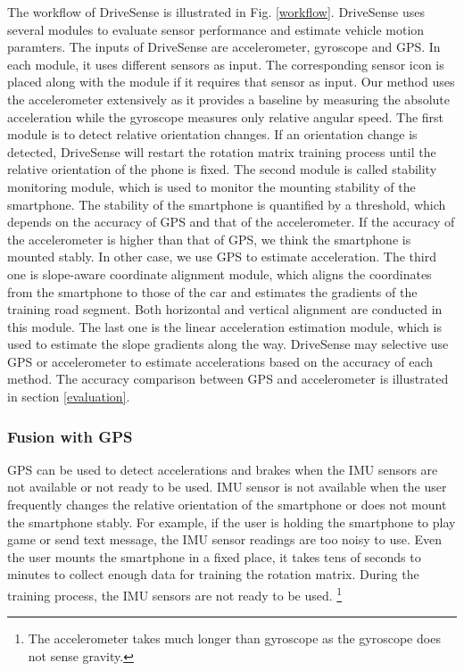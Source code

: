 The workflow of DriveSense is illustrated in Fig. \ref{workflow}. 
DriveSense uses several modules to evaluate sensor
performance and estimate vehicle motion paramters. 
The inputs of DriveSense are accelerometer, gyroscope
and GPS.  
In each module, it uses different sensors as input.  
The corresponding sensor icon is placed along with the 
module if it requires that sensor as input.  
Our method uses the accelerometer extensively
as it provides a baseline by measuring the absolute acceleration while
the gyroscope measures only relative angular speed. 
The first module is to detect relative orientation changes.  
If an orientation change is detected, 
DriveSense will restart the rotation matrix
training process until the 
relative orientation of the phone is fixed.  
The second module is called stability monitoring
module, which is used to monitor the mounting
stability of the smartphone. 
The stability of the smartphone is quantified
by a threshold, which depends on the 
accuracy of GPS and that of the accelerometer. 
If the accuracy of the accelerometer is higher
than that of GPS, we think the smartphone
is mounted stably. 
In other case, we use GPS to estimate acceleration.
The third one is slope-aware coordinate
alignment module, 
which aligns the coordinates from the smartphone
to those of the car and estimates
the gradients of the training road segment. 
Both horizontal and vertical alignment are conducted
in this module. 
The last one is the linear acceleration estimation
module, which is used to estimate the slope 
gradients along the way.
DriveSense may selective use GPS or accelerometer
to estimate accelerations based on
the accuracy of each method. 
The accuracy comparison between GPS and accelerometer
is illustrated in section \ref{evaluation}. 



\subsubsection{Fusion with GPS}


GPS can be used to detect accelerations and brakes
when the IMU sensors are not available or not
ready to be used. 
IMU sensor is not available when the user 
frequently changes the relative orientation of the smartphone
or does not mount the smartphone stably. 
For example, if the user is holding the smartphone
to play game or send text message, 
the IMU sensor readings are too noisy 
to use. 
Even the user mounts the smartphone in a 
fixed place, it takes tens of seconds to minutes 
to collect enough data for training the rotation matrix. 
During the training process, the 
IMU sensors are not ready to be used.  
\footnote{The accelerometer takes much longer than gyroscope
as the gyroscope does not sense gravity.}


